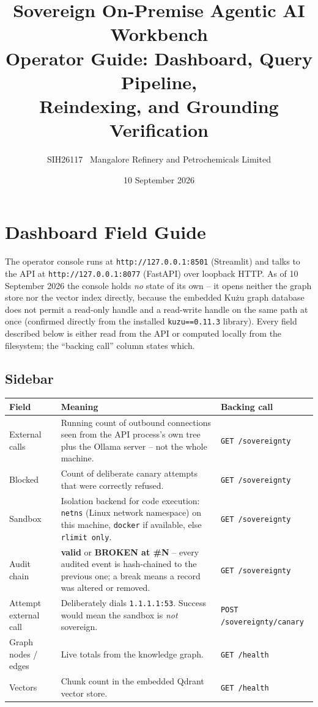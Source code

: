 \documentclass[11pt,a4paper]{article}
\title{\textbf{Sovereign On-Premise Agentic AI Workbench}\\[4pt]
       \Large Operator Guide: Dashboard, Query Pipeline,\\ Reindexing, and Grounding Verification}
\author{SIH26117 \textbar\ Mangalore Refinery and Petrochemicals Limited}
\date{10 September 2026}
\newcommand{\code}[1]{\texttt{\small #1}}
\newcommand{\term}[1]{\textbf{\color{accent}#1}}
\begin{document}
\maketitle
\thispagestyle{empty}
\clearpage
{\hypersetup{linkcolor=ink}\tableofcontents}
\clearpage

\section{Dashboard Field Guide}

The operator console runs at \code{http://127.0.0.1:8501} (Streamlit) and talks
to the API at \code{http://127.0.0.1:8077} (FastAPI) over loopback HTTP. As of
10 September 2026 the console holds \emph{no} state of its own -- it opens
neither the graph store nor the vector index directly, because the embedded
Ku\.zu graph database does not permit a read-only handle and a read-write
handle on the same path at once (confirmed directly from the installed
\code{kuzu==0.11.3} library). Every field described below is either read from
the API or computed locally from the filesystem; the ``backing call'' column
states which.

\subsection{Sidebar}

\begin{center}
\renewcommand{\arraystretch}{1.3}
\begin{tabularx}{\linewidth}{@{}l X l@{}}
\toprule
\textbf{Field} & \textbf{Meaning} & \textbf{Backing call} \\
\midrule
External calls & Running count of outbound connections seen from the API
  process's own tree plus the Ollama server -- not the whole machine. & \code{GET /sovereignty} \\
Blocked & Count of deliberate canary attempts that were correctly refused. & \code{GET /sovereignty} \\
Sandbox & Isolation backend for code execution: \code{netns} (Linux network
  namespace) on this machine, \code{docker} if available, else \code{rlimit only}. & \code{GET /sovereignty} \\
Audit chain & \term{valid} or \term{BROKEN at \#N} -- every audited event is
  hash-chained to the previous one; a break means a record was altered or removed. & \code{GET /sovereignty} \\
Attempt external call & Deliberately dials \code{1.1.1.1:53}. Success would mean the sandbox is \emph{not} sovereign. & \code{POST /sovereignty/canary} \\
Graph nodes / edges & Live totals from the knowledge graph. & \code{GET /health} \\
Vectors & Chunk count in the embedded Qdrant vector store. & \code{GET /health} \\
\bottomrule
\end{tabularx}
\end{center}
\end{document}
